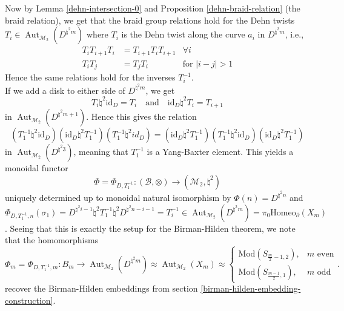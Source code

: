 \documentclass[reqno]{amsart}
\theoremstyle{definition}
\theoremstyle{remark}
\DeclareMathOperator{\Aut}{Aut}
\newcommand{\id}{{\mathrm{id}}}
\newcommand{\Mod}{{\mathrm{Mod}}}
\newcommand{\Homeo}{{\mathrm{Homeo}}}
\begin{document}
Now by Lemma \ref{dehn-intersection-0} and Proposition \ref{dehn-braid-relation}
(the braid relation), we get that the
braid group relations hold for the Dehn twists
$T_i \in \Aut_{\mathcal{M}_2}\left( D^{\natural^2 m} \right) $ 
where $T_i$ is the Dehn twist along the curve
$a_i$ in $D^{\natural^2 m}$, i.e.,
\begin{align*}
    T_{i}T_{i+1}T_i 
    &= T_{i+1} T_i T_{i+1} &\forall i\\
    T_i T_j 
    &= T_j T_i &\text{for } \left| i-j \right| >1
\end{align*}
Hence the same relations hold for the
inverses $T_{i}^{-1}$.\\
\linebreak
If we add a disk to either side of $D^{\natural^2 m}$, we get
\[
T_i \natural^2 \id_{D} = T_i \quad \text{and} \quad
\id_{D}\natural^2 T_i = T_{i+1}
\] 
in $\Aut_{\mathcal{M}_2}\left( D^{\natural^2 m+1} \right) $.
Hence this gives the relation
\[
    \left( T_1^{-1} \natural^2 \id_D \right) \left( \id_D \natural^2
    T_1^{-1} \right) \left( T_1^{-1} \natural^2 id_D \right) 
    = 
    \left( \id_D \natural^2 T_1^{-1} \right) 
    \left( T_1^{-1} \natural^2 \id_D \right) 
    \left( \id_D \natural^2 T_1^{-1} \right) 
\] 
in $\Aut_{\mathcal{M}_2} \left( D^{\natural^2 3} \right) $,
meaning that $T_1^{-1}$ is a Yang-Baxter element. This
yields a monoidal functor
\[
\Phi = \Phi_{D, T_1^{-1}} \colon
\left( \mathcal{B}, \otimes \right) 
\to \left( \mathcal{M}_2, \natural^2 \right) 
\] 
uniquely determined up to monoidal natural
isomorphism by
$\Phi (n) = D^{\natural^2 n}$ and
$\Phi_{D, T_1^{-1}, n} \left( \sigma_1 \right) =
D^{\natural^2 i-1} \natural^2  T_1^{-1} \natural^2
D^{\natural^2 n - i -1} =
T_i^{-1} \in 
\Aut_{\mathcal{M}_2}\left( D^{\natural^2 m} \right) 
= \pi_0 \Homeo_{\partial} \left( X_m \right)$.
Seeing that this is exactly
the setup for the Birman-Hilden theorem,
we note that the homomorphisms
\[
    \Phi_m = \Phi_{D,T_1^{-1},m}
\colon B_m \to \Aut_{\mathcal{M}_2}
\left( D^{\natural^2 m} \right) \approx
\Aut_{\mathcal{M}_2} \left( 
X_m\right)
\approx
\begin{cases}
    \Mod 
    \left( S_{\frac{m}{2}-1,2} \right) ,& m\text{ even}\\
    \Mod \left( 
S_{\frac{m-1}{2}, 1} \right),& m\text{ odd}
\end{cases}.
\] 
recover the Birman-Hilden embeddings from
section \ref{birman-hilden-embedding-construction}.
\end{document}
